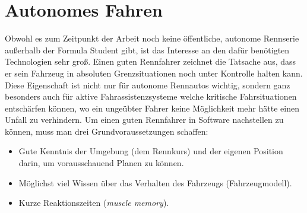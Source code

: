 \documentclass{like}
\begin{document}
  








\setcounter{page}{1}   %

\chapter{Autonomes Fahren}


Obwohl es zum Zeitpunkt der Arbeit noch keine öffentliche, autonome Rennserie außerhalb der Formula Student gibt, ist das Interesse an den dafür benötigten Technologien sehr groß.
Einen guten Rennfahrer zeichnet die Tatsache aus, dass er sein Fahrzeug in absoluten Grenzsituationen noch unter Kontrolle halten kann. Diese Eigenschaft ist nicht nur für autonome Rennautos wichtig, sondern ganz besonders auch für aktive Fahrassistenzsysteme welche kritische Fahrsituationen entschärfen können, wo ein ungeübter Fahrer keine Möglichkeit mehr hätte einen Unfall zu verhindern. Um einen guten Rennfahrer in Software nachstellen zu können, muss man drei Grundvoraussetzungen schaffen:
\begin{itemize}
	\item Gute Kenntnis der Umgebung (dem Rennkurs) und der eigenen Position darin, um vorausschauend Planen zu können.
	\item Möglichst viel Wissen über das Verhalten des Fahrzeugs (Fahrzeugmodell).
	\item Kurze Reaktionszeiten (\emph{muscle memory}).
\end{itemize}
\end{document}
